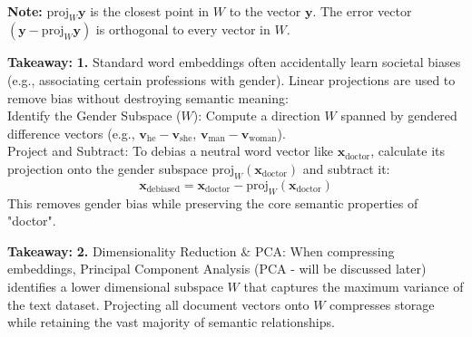 \documentclass[DIV=20,oneside]{scrartcl}
\newcommand{\note}{
	\noindent\textbf{\\Note: }
}
\newcommand{\takeaway}[1]{%
	\begin{tcolorbox}[
		colback=black!20,
		colframe=black,
		boxrule=0.5pt,
		arc=2mm]
		\textbf{Takeaway: } #1
	\end{tcolorbox}
}
\begin{document}
\note $\text{proj}_W \mathbf{y}$ is the closest point in $W$ to the vector $\mathbf{y}$. The error vector $(\mathbf{y} - \text{proj}_W \mathbf{y})$ is orthogonal to every vector in $W$.
\takeaway{\textbf{1. }Standard word embeddings often accidentally learn societal biases (e.g., associating certain professions with gender). Linear projections are used to remove bias without destroying semantic meaning: \\
	Identify the Gender Subspace ($W$): Compute a direction $W$ spanned by gendered difference vectors (e.g., $\mathbf{v}_{\text{he}} - \mathbf{v}_{\text{she}}$, $\mathbf{v}_{\text{man}} - \mathbf{v}_{\text{woman}}$).\\
	Project and Subtract: To debias a neutral word vector like $\mathbf{x}_{\text{doctor}}$, calculate its projection onto the gender subspace $\text{proj}_W(\mathbf{x}_{\text{doctor}})$ and subtract it:$$\mathbf{x}_{\text{debiased}} = \mathbf{x}_{\text{doctor}} - \text{proj}_W(\mathbf{x}_{\text{doctor}})$$This removes gender bias while preserving the core semantic properties of "doctor".}
	\takeaway{\textbf{2. }Dimensionality Reduction $\&$ PCA: When compressing embeddings, Principal Component Analysis (PCA - will be discussed later) identifies a lower dimensional subspace $W$ that captures the maximum variance of the text dataset. 	Projecting all document vectors onto $W$ compresses storage while retaining the vast majority of semantic relationships.}
	
\end{document}
